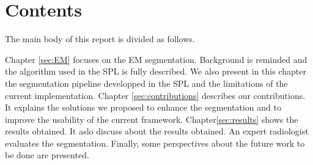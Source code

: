 \section{Contents}\label{intro:contents}
The main body of this report is divided as follows.
\par
Chapter \ref{sec:EM} focuses on the EM segmentation. Background is reminded and the algorithm used in the SPL is fully described. We also present in this chapter the segmentation pipeline developped in the SPL and the limitations of the current implementation.
Chapter \ref{sec:contributions} describes our contributions. It explains the solutions we proposed to enhance the segmentation and to improve the usability of the current framework.
Chapter\ref{sec:results} shows the results obtained. It aslo discuss about the results obtained. An expert radiologist evaluates the segmentation. Finally, some perspectives about the future work to be done are presented.
%
